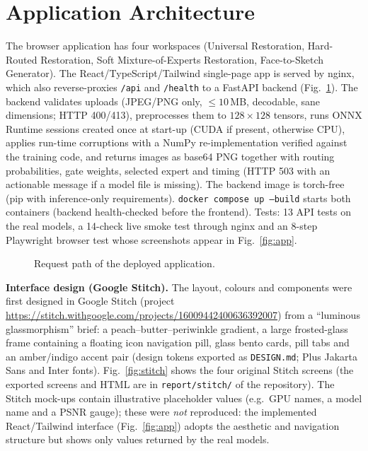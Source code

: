 \documentclass[conference]{IEEEtran}
\begin{document}
\section{Application Architecture}
The browser application has four workspaces (Universal Restoration, Hard-Routed Restoration, Soft Mixture-of-Experts Restoration, Face-to-Sketch Generator). The React/TypeScript/Tailwind single-page app is served by nginx, which also reverse-proxies \texttt{/api} and \texttt{/health} to a FastAPI backend (Fig.~\ref{fig:arch}). The backend validates uploads (JPEG/PNG only, $\le10$\,MB, decodable, sane dimensions; HTTP 400/413), preprocesses them to $128\times128$ tensors, runs ONNX Runtime sessions created once at start-up (CUDA if present, otherwise CPU), applies run-time corruptions with a NumPy re-implementation verified against the training code, and returns images as base64 PNG together with routing probabilities, gate weights, selected expert and timing (HTTP 503 with an actionable message if a model file is missing). The backend image is torch-free (pip with inference-only requirements). \texttt{docker compose up --build} starts both containers (backend health-checked before the frontend). Tests: 13 API tests on the real models, a 14-check live smoke test through nginx and an 8-step Playwright browser test whose screenshots appear in Fig.~\ref{fig:app}.
\begin{figure}[t]\centering
{}\caption{Request path of the deployed application.}\label{fig:arch}\end{figure}
\textbf{Interface design (Google Stitch).} The layout, colours and components were first designed in Google Stitch (project \url{https://stitch.withgoogle.com/projects/16009442400636392007}) from a ``luminous glassmorphism'' brief: a peach--butter--periwinkle gradient, a large frosted-glass frame containing a floating icon navigation pill, glass bento cards, pill tabs and an amber/indigo accent pair (design tokens exported as \texttt{DESIGN.md}; Plus Jakarta Sans and Inter fonts). Fig.~\ref{fig:stitch} shows the four original Stitch screens (the exported screens and HTML are in \texttt{report/stitch/} of the repository). The Stitch mock-ups contain illustrative placeholder values (e.g.\ GPU names, a model name and a PSNR gauge); these were \emph{not} reproduced: the implemented React/Tailwind interface (Fig.~\ref{fig:app}) adopts the aesthetic and navigation structure but shows only values returned by the real models.
\end{document}
